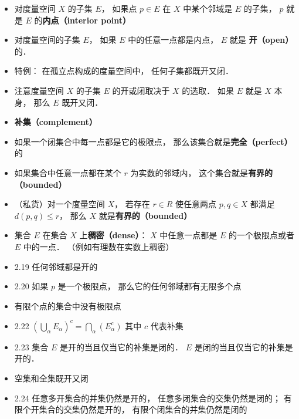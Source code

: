 \begin{itemize}
\item 对度量空间 $X$ 的子集 $E$， 如果点 $p \in E$ 在 $X$ 中某个邻域是 $E$ 的子集， $p$ 就是 $E$ 的\textbf{内点（interior point）}

\item 对度量空间的子集 $E$， 如果 $E$ 中的任意一点都是内点， $E$ 就是 \textbf{开（open）} 的．

\item 特例： 在孤立点构成的度量空间中， 任何子集都既开又闭．

\item 注意度量空间 $X$ 的子集 $E$ 的开或闭取决于 $X$ 的选取． 如果 $E$ 就是 $X$ 本身， 那么 $E$ 既开又闭．

\item \textbf{补集（complement）}

\item 如果一个闭集合中每一点都是它的极限点， 那么该集合就是\textbf{完全（perfect）} 的

\item 如果集合中任意一点都在某个 $r$ 为实数的邻域内， 这个集合就是\textbf{有界的（bounded）}

\item （私货）对一个度量空间 $X$， 若存在 $r\in R$ 使任意两点 $p,q\in X$ 都满足 $d(p,q) \leqslant r$， 那么 $X$ 就是\textbf{有界的（bounded）}

\item 集合 $E$ 在集合 $X$ 上\textbf{稠密（dense）}： $X$ 中任意一点都是 $E$ 的一个极限点或者 $E$ 中的一点． （例如有理数在实数上稠密）

\item 2.19 任何邻域都是开的

\item 2.20 如果 $p$ 是一个极限点， 那么它的任何邻域都有无限多个点

\item 有限个点的集合中没有极限点

\item 2.22 $(\bigcup_\alpha E_\alpha)^c = \bigcap_\alpha (E_\alpha^c)$ 其中 $c$ 代表补集

\item 2.23 集合 $E$ 是开的当且仅当它的补集是闭的． $E$ 是闭的当且仅当它的补集是开的．

\item 空集和全集既开又闭

\item 2.24 任意多开集合的并集仍然是开的， 任意多闭集合的交集仍然是闭的； 有限个开集合的交集仍然是开的， 有限个闭集合的并集仍然是闭的


\end{itemize}
